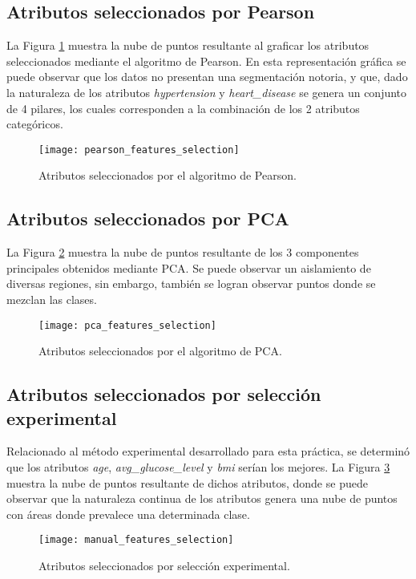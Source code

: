 \subsection{Atributos seleccionados por Pearson}
La Figura \ref{Fig: PearsonAtr} muestra la nube de puntos resultante al graficar los atributos seleccionados mediante el algoritmo de Pearson. En esta representación gráfica se puede observar que los datos no presentan una segmentación notoria, y que, dado la naturaleza de los atributos \emph{hypertension} y \emph{heart\_disease} se genera un conjunto de 4 pilares, los cuales corresponden a la combinación de los 2 atributos categóricos.

\begin{figure}[htbp]
	\centering
	\texttt{[image: pearson\_features\_selection]}
	\caption{Atributos seleccionados por el algoritmo de Pearson.}
	\label{Fig: PearsonAtr}
\end{figure}

\subsection{Atributos seleccionados por PCA}
La Figura \ref{Fig: PCAAtr} muestra la nube de puntos resultante de los 3 componentes principales obtenidos mediante PCA. Se puede observar un aislamiento de diversas regiones, sin embargo, también se logran observar puntos donde se mezclan las clases.

\begin{figure}[htbp]
	\centering
	\texttt{[image: pca\_features\_selection]}
	\caption{Atributos seleccionados por el algoritmo de PCA.}
	\label{Fig: PCAAtr}
\end{figure}

\FloatBarrier
\newpage
\subsection{Atributos seleccionados por selección experimental}
Relacionado al método experimental desarrollado para esta práctica, se determinó que los atributos \emph{age}, \emph{avg\_glucose\_level} y \emph{bmi} serían los mejores. La Figura \ref{Fig: ExpAtr} muestra la nube de puntos resultante de dichos atributos, donde se puede observar que la naturaleza continua de los atributos genera una nube de puntos con áreas donde prevalece una determinada clase.

\begin{figure}[htbp]
	\centering
	\texttt{[image: manual\_features\_selection]}
	\caption{Atributos seleccionados por selección experimental.}
	\label{Fig: ExpAtr}
\end{figure}


